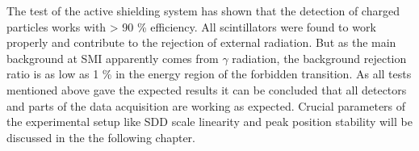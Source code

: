 The test of the active shielding system has shown that the detection of charged particles works with > 90 \% efficiency. All scintillators were found to work properly and contribute to the rejection of external radiation. But as the main background at SMI apparently comes from $\gamma$ radiation, the background rejection ratio is as low as 1 \% in the energy region of the forbidden transition. As all tests mentioned above gave the expected results it can be concluded that all detectors and parts of the data acquisition are working as expected. Crucial parameters of the experimental setup like SDD scale linearity and peak position stability will be discussed in the the following chapter.





